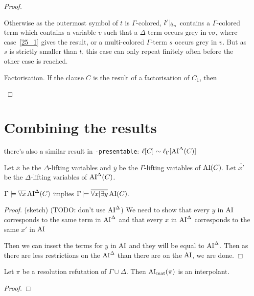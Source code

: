 \documentclass[,%
	draft=false,%
	numbers=noendperiod
	11pt,
	a4paper,
	oneside,%
	openany,
]{memoir}
\begin{document}
\begin{proof}
\begin{description}
\begin{enumerate}
					Otherwise as the outermost symbol of $t$ is $\Gamma$-colored, $l'|_{\bm\hat u_n}$ contains a $\Gamma$-colored term which contains a variable $v$ such that a $\Delta$-term occurs grey in $v\sigma$, where case~\ref{25_1} gives the result, or a multi-colored $\Gamma$-term $s$ occurs grey in $v$. But as $s$ is strictly smaller than $t$, this case can only repeat finitely often before the other case is reached.

			\end{enumerate}


		\item{}Factorisation.
			If the clause $C$ is the result of a factorisation of $C_1$, then
			\mytodo{}
			\qedhere
	\end{description}


\end{proof}



\section{Combining the results}


there's also a similar result in \texttt{-presentable}: $\ell[C] \sim \ell_{\Gamma}[ \operatorname{AI}^\Delta(C) ] $

\begin{lemma}
	Let $\overline x$ be the $\Delta$-lifting variables and $\overline y$ be the $\Gamma$-lifting variables of $\operatorname{AI}(C)$.
	Let $\overline {x'}$ be the $\Delta$-lifting variables of $\operatorname{AI}^\Delta(C)$.

	$\Gamma \models \overline{\forall x} \operatorname{AI}^\Delta(C)$ implies
	$\Gamma \models \overline{\forall x | \exists y} \operatorname{AI}(C)$.
\end{lemma}
\begin{proof}
	\cbstart
	(sketch) (TODO: don't use $\operatorname{AI}^\Delta$)
	We need to show that every $y$ in $\operatorname{AI}$ corresponds to the same term in $\operatorname{AI}^\Delta$ and that every $x$ in $\operatorname{AI}^\Delta$ corresponds to the same $x'$ in $\operatorname{AI}$

	Then we can insert the terms for $y$ in $\operatorname{AI}$ and they will be equal to $\operatorname{AI}^\Delta$. Then as there are less restrictions on the $\operatorname{AI}^\Delta$ than there are on the $\operatorname{AI}$, we are done.
	\cbend
\end{proof}


\begin{thm}
	Let $\pi$ be a resolution refutation of $\Gamma\cup\Delta$.
	Then $\operatorname{AI}_\mathrm{mat}( \pi )$ is an interpolant.
\end{thm}
\begin{proof}

\end{proof}
\end{document}
